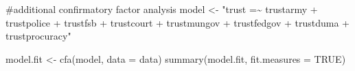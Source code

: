 \documentclass[
  letterpaper,
  DIV=11,
  numbers=noendperiod]{scrartcl}
\newenvironment{Shaded}{\begin{snugshade}}{\end{snugshade}}
\newcommand{\AttributeTok}[1]{\textcolor[rgb]{0.40,0.45,0.13}{#1}}
\newcommand{\CommentTok}[1]{\textcolor[rgb]{0.37,0.37,0.37}{#1}}
\newcommand{\ConstantTok}[1]{\textcolor[rgb]{0.56,0.35,0.01}{#1}}
\newcommand{\FunctionTok}[1]{\textcolor[rgb]{0.28,0.35,0.67}{#1}}
\newcommand{\NormalTok}[1]{\textcolor[rgb]{0.00,0.23,0.31}{#1}}
\newcommand{\OtherTok}[1]{\textcolor[rgb]{0.00,0.23,0.31}{#1}}
\newcommand{\StringTok}[1]{\textcolor[rgb]{0.13,0.47,0.30}{#1}}
\begin{document}
\begin{table}[!h]
\centering\centering
\caption{\label{tab:unnamed-chunk-15}Robustness check on Gov't Trust: Factor Loading Score-Weighted Index}
\centering
{}
\end{table}

\begin{Shaded}
\begin{Highlighting}[]
\CommentTok{\#additional confirmatory factor analysis}
\NormalTok{model }\OtherTok{\textless{}{-}} \StringTok{"trust =\textasciitilde{} trustarmy + trustpolice + trustfsb + trustcourt +}
\StringTok{                   trustmungov + trustfedgov + trustduma + trustprocuracy"}

\NormalTok{model.fit }\OtherTok{\textless{}{-}} \FunctionTok{cfa}\NormalTok{(model, }\AttributeTok{data =}\NormalTok{ data)}
\FunctionTok{summary}\NormalTok{(model.fit, }\AttributeTok{fit.measures =} \ConstantTok{TRUE}\NormalTok{)}
\end{Highlighting}
\end{Shaded}
\end{document}
